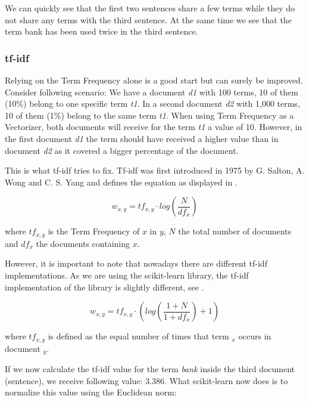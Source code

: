 We can quickly see that the first two sentences share a few terms
while they do not share any terms with the third sentence.
At the same time we see that the term bank has been used twice in the third sentence.

\subsubsection{tf-idf}
\label{subsubsec:3_tf_idf}

Relying on the Term Frequency alone is a good start but can surely be improved.
Consider following scenario:
We have a document \textit{d1} with 100 terms, 10 of them (10\%) belong to one specific term \textit{t1}.
In a second document \textit{d2} with 1,000 terms, 10 of them (1\%) belong to the same term \textit{t1}.
When using Term Frequency as a Vectorizer, both documents will receive for the term \textit{t1} a value of 10.
However, in the first document \textit{d1} the term should have received a higher value
than in document \textit{d2} as it covered a bigger percentage of the document.

This is what tf-idf tries to fix.
Tf-idf was first introduced in 1975 by G. Salton, A. Wong and C. S. Yang\cite{salton1975}
and defines the equation as displayed in .

\begin{equation}
    w_{x,y} = tf_{x,y} \cdot log(\frac{N}{df_x})
    \label{equ:tfidf}
\end{equation}

where $tf_{x,y}$ is the Term Frequency of $x$ in $y$, $N$ the total number of documents
and $df_x$ the documents containing $x$.

However, it is important to note that nowadays there are different tf-idf implementations.
As we are using the scikit-learn\cite{scikit-learn} library,
the tf-idf implementation\cite{scikit_tfidf} of the library is slightly different,
see .

\begin{equation}
    w_{x,y} = tf_{x,y} \cdot (log(\frac{1+N}{1+df_x}) + 1)
    \label{equ:scikit_tfidf}
\end{equation}

where $tf_{x,y}$ is defined as the equal number of times that term ${_x}$ occurs in document ${_y}$.

If we now calculate the tf-idf value for the term \textit{bank} inside the third document (sentence),
we receive following value: $3.386$.
What scikit-learn now does is to normalize this value using the Euclidean norm:

